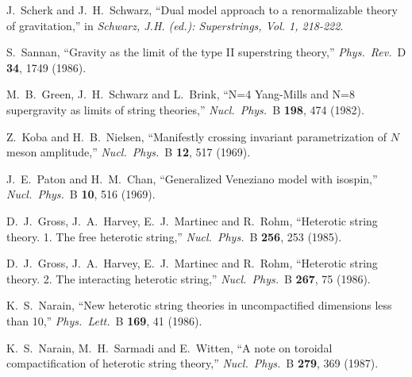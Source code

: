 \documentclass[12pt]{livrev}
\begin{document}
\begin{thebibliography}{99}
J.~Scherk and J.~H.~Schwarz,
``Dual model approach to a renormalizable theory of gravitation,''
in {\it  Schwarz, J.H. (ed.): Superstrings, Vol. 1, 218-222}.

S.~Sannan,
``Gravity as the limit of the type II superstring theory,''
{\it Phys.\ Rev.}\ D {\bf 34}, 1749 (1986).

M.~B.~Green, J.~H.~Schwarz and L.~Brink,
``N=4 Yang-Mills and N=8 supergravity as limits of string theories,''
{\it Nucl.\ Phys.}\ B {\bf 198}, 474 (1982).

Z.~Koba and H.~B.~Nielsen,
``Manifestly crossing invariant parametrization of $N$ meson amplitude,''
{\it Nucl.\ Phys.}\ B {\bf 12}, 517 (1969).

J.~E.~Paton and H.~M.~Chan,
``Generalized Veneziano model with isospin,''
{\it Nucl.\ Phys.}\ B {\bf 10}, 516 (1969).

D.~J.~Gross, J.~A.~Harvey, E.~J.~Martinec and R.~Rohm,
``Heterotic string theory. 1. The free heterotic string,''
{\it Nucl.\ Phys.}\ B {\bf 256}, 253 (1985).

D.~J.~Gross, J.~A.~Harvey, E.~J.~Martinec and R.~Rohm,
``Heterotic string theory. 2. The interacting heterotic string,''
{\it Nucl.\ Phys.}\ B {\bf 267}, 75 (1986).

K.~S.~Narain,
``New heterotic string theories in uncompactified dimensions less than 10,''
{\it Phys.\ Lett.}\ B {\bf 169}, 41 (1986).

K.~S.~Narain, M.~H.~Sarmadi and E.~Witten,
``A note on toroidal compactification of heterotic string theory,''
{\it Nucl.\ Phys.}\ B {\bf 279}, 369 (1987).


\end{thebibliography}
\end{document}
